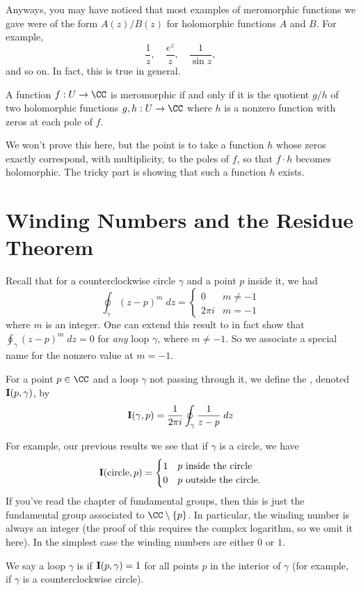Anyways, you may have noticed that most examples of meromorphic functions we gave
were of the form $A(z) / B(z)$ for holomorphic functions $A$ and $B$.
For example, \[ \frac 1z, \quad \frac{e^z}{z}, \quad \frac{1}{\sin z}, \] and so on.
In fact, this is true in general.
\begin{theorem}
	A function $f : U \to \CC$ is meromorphic
	if and only if it is the quotient $g/h$ of two holomorphic functions $g,h : U \to \CC$
	where $h$ is a nonzero function with zeros at each pole of $f$.
\end{theorem}
We won't prove this here, but the point is to take a function $h$ whose zeros exactly
correspond, with multiplicity, to the poles of $f$, so that $f \cdot h$ becomes holomorphic.
The tricky part is showing that such a function $h$ exists.

\section{Winding Numbers and the Residue Theorem}
Recall that for a counterclockwise circle $\gamma$ and a point $p$ inside it, we had
\[
	\oint_{\gamma} (z-p)^m \; dz =
	\begin{cases}
		0 & m \neq -1 \\
		2\pi i & m = -1
	\end{cases}
\]
where $m$ is an integer.
One can extend this result to in fact show that $\oint_\gamma (z-p)^m \; dz = 0$
for \emph{any} loop $\gamma$, where $m \neq -1$.
So we associate a special name for the nonzero value at $m=-1$.
\begin{definition}
	For a point $p \in \CC$ and a loop $\gamma$ not passing through it,
	we define the , denoted $\operatorname{\mathbf I}(p, \gamma)$, by
	\[
		\operatorname{\mathbf I}(\gamma, p) = \frac{1}{2\pi i} \oint_{\gamma} \frac{1}{z-p} \; dz
	\]
\end{definition}
For example, our previous results we see that if $\gamma$ is a circle, we have
\[
	\operatorname{\mathbf I}(\text{circle}, p)
	=
	\begin{cases}
		1 & \text{$p$ inside the circle} \\
		0 & \text{$p$ outside the circle}.
	\end{cases}
\]
If you've read the chapter of fundamental groups, then this is just the fundamental group
associated to $\CC \setminus \{p\}$.
In particular, the winding number is always an integer (the proof of this requires the complex logarithm,
so we omit it here).
In the simplest case the winding numbers are either $0$ or $1$.
\begin{definition}
	We say a loop $\gamma$ is  if $\operatorname{\mathbf I}(p, \gamma) = 1$
	for all points $p$ in the interior of $\gamma$ (for example,
	if $\gamma$ is a counterclockwise circle).
\end{definition}


